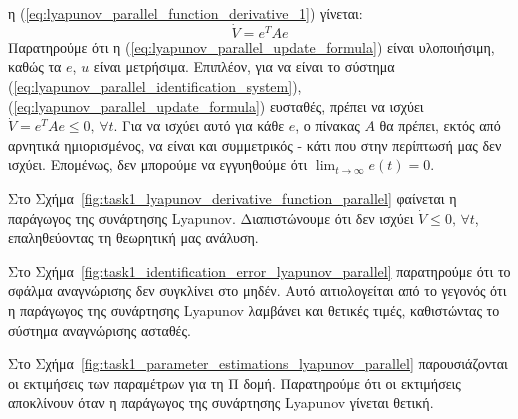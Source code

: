 \documentclass[a4paper,12pt]{article}
\begin{document}
η (\ref{eq:lyapunov_parallel_function_derivative_1}) γίνεται:
\begin{equation}
    \dot{V} = e^TAe
    \label{eq:lyapunov_parallel_function_derivative_2}
\end{equation}
Παρατηρούμε ότι η (\ref{eq:lyapunov_parallel_update_formula}) είναι υλοποιήσιμη, καθώς τα $e$, $u$ είναι 
μετρήσιμα. Επιπλέον, για να είναι το σύστημα (\ref{eq:lyapunov_parallel_identification_system}), 
(\ref{eq:lyapunov_parallel_update_formula}) ευσταθές, πρέπει να ισχύει $\dot{V} = e^T A e \leq 0,\, \forall t$. 
Για να ισχύει αυτό για κάθε $e$, ο πίνακας $A$ θα πρέπει, εκτός από αρνητικά ημιορισμένος, να είναι και 
συμμετρικός - κάτι που στην περίπτωσή μας δεν ισχύει. Επομένως, δεν μπορούμε να εγγυηθούμε ότι 
$\lim_{t \to \infty} e(t) = 0$.

Στο Σχήμα~\ref{fig:task1_lyapunov_derivative_function_parallel} φαίνεται η παράγωγος της συνάρτησης 
Lyapunov. Διαπιστώνουμε ότι δεν ισχύει 
$\dot{V} \leq 0, \, \forall t$, επαληθεύοντας τη θεωρητική μας ανάλυση.

Στο Σχήμα~\ref{fig:task1_identification_error_lyapunov_parallel} παρατηρούμε ότι το σφάλμα αναγνώρισης
δεν συγκλίνει στο μηδέν. Αυτό αιτιολογείται από το γεγονός ότι η παράγωγος της συνάρτησης 
Lyapunov λαμβάνει και θετικές τιμές, καθιστώντας το σύστημα
αναγνώρισης ασταθές.

Στο Σχήμα~\ref{fig:task1_parameter_estimations_lyapunov_parallel} παρουσιάζονται οι εκτιμήσεις των παραμέτρων
για τη Π δομή. Παρατηρούμε ότι οι εκτιμήσεις αποκλίνουν όταν η παράγωγος της συνάρτησης 
Lyapunov γίνεται θετική.
\end{document}
